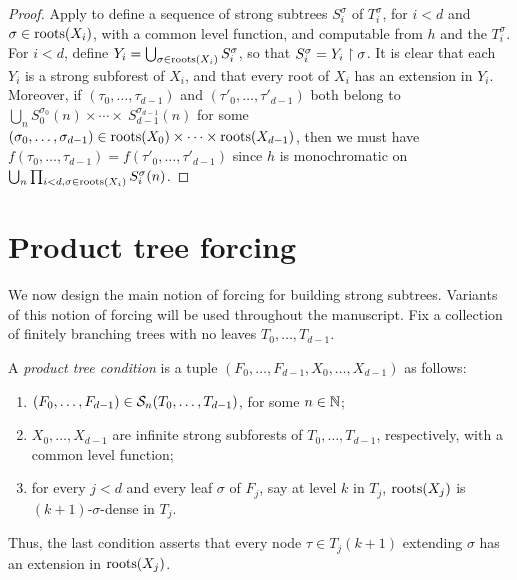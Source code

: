 \begin{proof}
    Apply  to define a sequence of strong subtrees $S_i^\sigma$ of $T_i^\sigma$, for $i<d$ and $\sigma\in \operatorname{roots}(X_i)$, with a common level function, and computable from $h$ and the $T_i^\sigma$. For $i<d$, define $Y_i=\bigcup_{\sigma\in\operatorname{roots}(X_i)}S_i^\sigma$, so that $S^\sigma_i = Y_i \upharpoonright \sigma$. It is clear that each $Y_i$ is a strong subforest of $X_i$, and that every root of $X_i$ has an extension in $Y_i$. Moreover,
    if $(\tau_0,\ldots,\tau_{d-1})$ and $(\tau'_0,\ldots,\tau'_{d-1})$ both belong to $\bigcup_n S_0^{\sigma_0}(n) \times \cdots \times \ S_{d-1}^{\sigma_{d-1}}(n)$ for some $(\sigma_0,\ldots,\sigma_{d-1}) \in \operatorname{roots}(X_0) \times \cdots \times \operatorname{roots}(X_{d-1})$, then we must have $f(\tau_0,\ldots,\tau_{d-1}) = f(\tau'_0,\ldots,\tau'_{d-1})$ since $h$ is monochromatic on $\bigcup_n \prod_{\substack{i<d, \sigma\in \operatorname{roots}(X_i)}}S_i^\sigma(n)$.
\end{proof}

\section{Product tree forcing}\label{subsect:product-tree-forcing}

We now design the main notion of forcing for building strong subtrees. Variants of this notion of forcing will be used throughout the manuscript.
Fix a collection of finitely branching trees with no leaves $T_0, \dots,\allowbreak T_{d-1}$.

\begin{definition}\label{def:product-tree-condition}
A \emph{product tree condition} is a tuple $(F_0, \dots, F_{d-1}, X_0, \dots,X_{d-1})$ as follows:
	\begin{enumerate}
		\item $(F_0, \dots, F_{d-1}) \in \mathcal{S}_{n}({T_0, \dots, T_{d-1}})$, for some $n \in \mathbb{N}$;
		\item  $X_0, \dots, X_{d-1}$ are infinite strong subforests of $T_0, \dots, T_{d-1}$, respectively, with a common level function;
		\item for every $j < d$ and every leaf $\sigma$ of $F_j$, say at level $k$ in $T_j$, $\operatorname{roots}(X_j)$ is $(k+1)$-$\sigma$-dense in $T_j$.
	\end{enumerate}
\end{definition}

\noindent Thus, the last condition asserts that every node $\tau \in T_j(k+1)$ extending $\sigma$ has an extension in $\operatorname{roots}(X_j)$.

